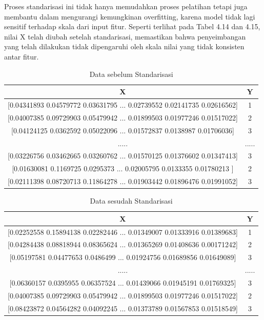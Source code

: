 Proses standarisasi ini tidak hanya memudahkan proses pelatihan tetapi juga membantu dalam mengurangi kemungkinan overfitting, karena model tidak lagi sensitif terhadap skala dari input fitur. Seperti terlihat pada Tabel 4.14 dan 4.15, nilai X telah diubah setelah standarisasi, memastikan bahwa penyeimbangan yang telah dilakukan tidak dipengaruhi oleh skala nilai yang tidak konsisten antar fitur.

\begin{longtable}{|c|c|}
  \caption{Data sebelum Standarisasi}
  \label{tb:bfStandard}                                   \\
  \hline
  \rowcolor[HTML]{C0C0C0}
  \textbf{X} & \textbf{Y} \\
  \hline
  {[}0.04341893 0.04579772 0.03631795 ... 0.02739552 0.02141735 0.02616562{]} & 1  \\
  {[}0.04007385 0.09729903 0.05479942 ... 0.01899503 0.01977246 0.01517022{]} & 2  \\
  {[}0.04124125 0.0362592  0.05022096 ... 0.01572837 0.0138987  0.01706036{]} & 3  \\
  ..... & .....  \\
  {[}0.03226756 0.03462665 0.03260762 ... 0.01570125 0.01376602 0.01347413{]} & 3  \\
  {[}0.01630081 0.1169725  0.0295373  ... 0.02005795 0.0133355  0.01780213 {]} & 2  \\
  {[}0.02111398 0.08720713 0.11864278 ... 0.01903442 0.01896476 0.01991052{]} & 3\\
  \hline
\end{longtable}

\begin{longtable}{|c|c|}
  \caption{Data sesudah Standarisasi}
  \label{tb:afStandard}                                   \\
  \hline
  \rowcolor[HTML]{C0C0C0}
  \textbf{X} & \textbf{Y} \\
  \hline
  {[}0.02252558 0.15894138 0.02282446 ... 0.01349007 0.01333916 0.01389683{]} & 1  \\
  {[}0.04284438 0.08818944 0.08365624 ... 0.01365269 0.01408636 0.00171242{]} & 2  \\
  {[}0.05197581 0.04477653 0.0486499  ... 0.01924756 0.01689856 0.01649089{]} & 3  \\
  ..... & .....  \\
  {[}0.06360157 0.0395955  0.06357524 ... 0.01439066 0.01945191 0.01769325{]} & 3  \\
  {[}0.04007385 0.09729903 0.05479942 ... 0.01899503 0.01977246 0.01517022{]} & 2  \\
  {[}0.08423872 0.04564282 0.04092245 ... 0.01373789 0.01567853 0.01518549{]} & 3\\
  \hline
\end{longtable}

